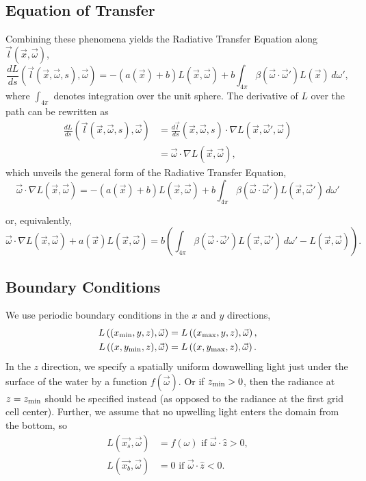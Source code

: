 \subsection{Equation of Transfer}
Combining these phenomena yields the Radiative Transfer Equation along
$\vec{l}(\vec{x}, \vec{\omega})$,
\begin{equation}
  \label{eqn:rte1d}
  \frac{dL}{ds}(\vec{l}(\vec{x}, \vec{\omega}, s), \vec{\omega})
  = -(a(\vec{x}) + b)L(\vec{x}, \vec{\omega})
  + b \int_{4\pi} \beta(\vec{\omega}\cdot\vec{\omega}') L(\vec{x})\, d\omega',
\end{equation}
where $\int_{4\pi}$ denotes integration over the unit sphere.
The derivative of $L$ over the path can be rewritten as
\begin{align*}
  \frac{dL}{ds}(\vec{l}(\vec{x}, \vec{\omega}, s), \vec{\omega})
    &= \frac{d\vec{l}}{ds}(\vec{x}, \vec{\omega}, s) \cdot \nabla L(\vec{x}, \vec{\omega}', \vec{\omega}) \\
    &= \vec{\omega} \cdot \nabla L(\vec{x}, \vec{\omega}),
\end{align*}
which unveils the general form of the Radiative Transfer Equation,
\begin{equation*}
  \vec{\omega} \cdot \nabla L(\vec{x}, \vec{\omega})
  = -(a(\vec{x}) + b)L(\vec{x}, \vec{\omega})
  + b \int_{4\pi} \beta(\vec{\omega}\cdot\vec{\omega}') L(\vec{x}, \vec{\omega}')\, d\omega'
\end{equation*}

or, equivalently,
\begin{equation}
  \vec{\omega} \cdot \nabla L(\vec{x}, \vec{\omega})
  + a(\vec{x})L(\vec{x}, \vec{\omega})
  = b \left(
    \int_{4\pi} \beta(\vec{\omega}\cdot\vec{\omega}') L(\vec{x}, \vec{\omega}')\, d\omega'
    - L(\vec{x}, \vec{\omega})
  \right).
  \label{eqn:rte}
\end{equation}

\subsection{Boundary Conditions}

We use periodic boundary conditions in the $x$ and $y$ directions,
\begin{align*}
  L\left(({x_{\min}}, y, z), \vec{\omega}\right) &= L\left(({x_{\max}}, y, z), \vec{\omega}\right), \\
  L\left((x, {y_{\min}}, z), \vec{\omega}\right) &= L\left((x, {y_{\max}}, z), \vec{\omega}\right).
\end{align*}
In the $z$ direction, we specify a spatially uniform downwelling light just
under the surface of the water by a function $f(\vec{\omega})$.
Or if ${z_{\min}}>0$, then the radiance at $z={z_{\min}}$ should be specified instead (as opposed to the radiance at the first grid cell center).
Further, we assume that no upwelling light enters the domain from the bottom, so
\begin{align*}
  L(\vec{x_s}, \vec{\omega}) &= f(\omega) \mbox{ if } \vec{\omega} \cdot \hat{z} > 0, \\ 
  L(\vec{x_b}, \vec{\omega}) &= 0 \mbox { if } \vec{\omega} \cdot \hat{z} < 0.
\end{align*}
 
